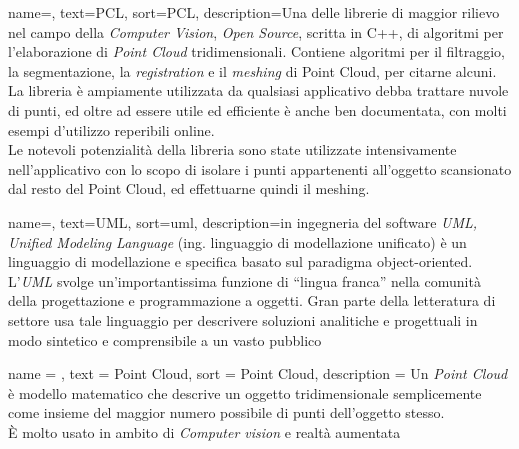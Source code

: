 
\renewcommand{\acronymname}{Acronimi e abbreviazioni}


       


{
    name=,
    text=PCL,
    sort=PCL,
    description={Una  delle librerie di maggior rilievo nel campo della \emph{Computer Vision}, \emph{Open Source}, scritta in C++, di algoritmi per l'elaborazione di \emph{Point Cloud} tridimensionali. Contiene algoritmi per il filtraggio, la segmentazione, la \emph{registration} e il \emph{meshing} di Point Cloud, per citarne alcuni. \\
La libreria è ampiamente utilizzata da qualsiasi applicativo debba trattare nuvole di punti, ed oltre ad essere utile ed efficiente è anche ben documentata, con molti esempi d'utilizzo reperibili online.\\
Le notevoli potenzialità della libreria sono state utilizzate intensivamente nell'applicativo con lo scopo di isolare i punti appartenenti all'oggetto scansionato dal resto del Point Cloud, ed effettuarne quindi il meshing.}
}

{
    name=,
    text=UML,
    sort=uml,
    description={in ingegneria del software \emph{UML, Unified Modeling Language} (ing. linguaggio di modellazione unificato) è un linguaggio di modellazione e specifica basato sul paradigma object-oriented. L'\emph{UML} svolge un'importantissima funzione di ``lingua franca'' nella comunità della progettazione e programmazione a oggetti. Gran parte della letteratura di settore usa tale linguaggio per descrivere soluzioni analitiche e progettuali in modo sintetico e comprensibile a un vasto pubblico}
}

 {
	name = ,
	text = Point Cloud,
	sort = Point Cloud,
	description = {Un \emph{Point Cloud} è modello matematico che descrive un oggetto tridimensionale semplicemente come insieme del maggior numero possibile di punti dell'oggetto stesso.\\
È molto usato in ambito di \emph{Computer vision} e realtà aumentata}
}


